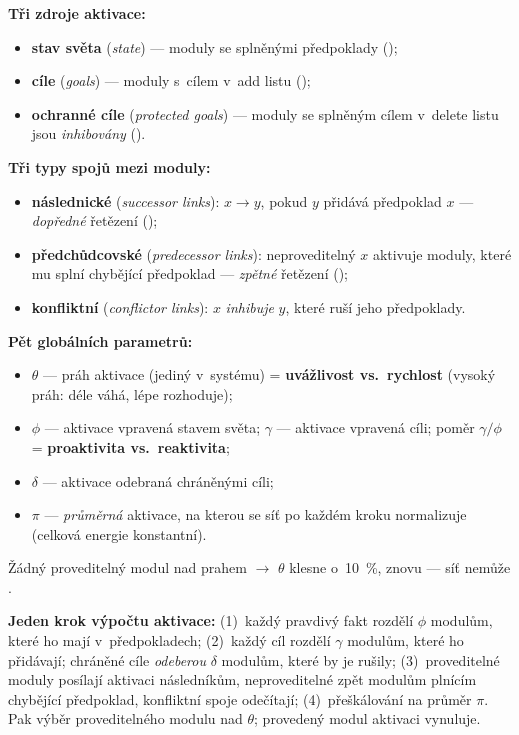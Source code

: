 \documentclass[11pt,a4paper]{article}
\theoremstyle{definition}
\begin{document}
\textbf{Tři zdroje aktivace:}
\begin{itemize}
\item \textbf{stav světa} (\emph{state}) --- moduly se splněnými předpoklady
  ();
\item \textbf{cíle} (\emph{goals}) --- moduly s~cílem v~add listu ();
\item \textbf{ochranné cíle} (\emph{protected goals}) --- moduly se splněným cílem v~delete
  listu jsou \emph{inhibovány} ().
\end{itemize}
\textbf{Tři typy spojů mezi moduly:}
\begin{itemize}
\item \textbf{následnické} (\emph{successor links}): $x \to y$, pokud $y$ přidává předpoklad
  $x$ --- \emph{dopředné} řetězení ();
\item \textbf{předchůdcovské} (\emph{predecessor links}): neproveditelný $x$ aktivuje moduly,
  které mu splní chybějící předpoklad --- \emph{zpětné} řetězení ();
\item \textbf{konfliktní} (\emph{conflictor links}): $x$ \emph{inhibuje} $y$, které ruší jeho
  předpoklady.
\end{itemize}
\textbf{Pět globálních parametrů:}
\begin{itemize}
\item $\theta$ --- práh aktivace (jediný v~systému) = \textbf{uvážlivost vs.\ rychlost}
  (vysoký práh: déle váhá, lépe rozhoduje);
\item $\phi$ --- aktivace vpravená stavem světa; $\gamma$ --- aktivace vpravená cíli;
  poměr $\gamma/\phi$ = \textbf{proaktivita vs.\ reaktivita};
\item $\delta$ --- aktivace odebraná chráněnými cíli;
\item $\pi$ --- \emph{průměrná} aktivace, na kterou se síť po každém kroku normalizuje
  (celková energie konstantní).
\end{itemize}
Žádný proveditelný modul nad prahem $\to$ $\theta$ klesne o~10~\%, znovu --- síť nemůže
.

\textbf{Jeden krok výpočtu aktivace:} (1)~každý pravdivý fakt rozdělí $\phi$ modulům, které
ho mají v~předpokladech; (2)~každý cíl rozdělí $\gamma$ modulům, které ho přidávají;
chráněné cíle \emph{odeberou} $\delta$ modulům, které by je rušily; (3)~proveditelné moduly
posílají aktivaci následníkům, neproveditelné zpět modulům plnícím chybějící předpoklad,
konfliktní spoje odečítají; (4)~přeškálování na průměr $\pi$. Pak výběr proveditelného
modulu nad $\theta$; provedený modul aktivaci vynuluje.
\end{document}
